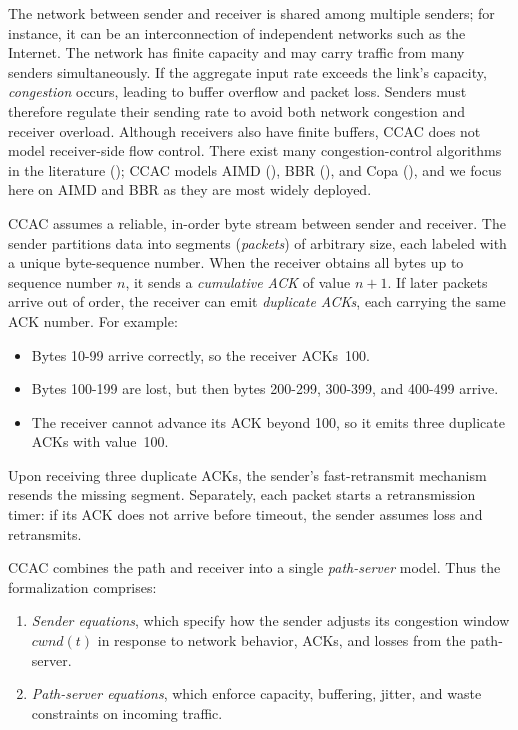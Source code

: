\documentclass[12pt]{l4dc2023}
\begin{document}
The network between sender and receiver is shared among multiple senders; for instance, it can be an interconnection of independent networks such as the Internet. The network has finite capacity and may carry traffic from many senders simultaneously.  
If the aggregate input rate exceeds the link's capacity, \emph{congestion} occurs, leading to buffer overflow and packet loss. Senders must therefore regulate their sending rate to avoid both network congestion and receiver overload. Although receivers also have finite buffers, CCAC does not model receiver-side flow control. There exist many congestion-control algorithms in the literature (\cite{jiang_when_2021}); CCAC models AIMD (\cite{aimd}), BBR (\cite{bbr}), and Copa (\cite{copa}), and we focus here on AIMD and BBR as they are most widely deployed.

CCAC assumes a reliable, in-order byte stream between sender and receiver. The sender partitions data into segments (\emph{packets}) of arbitrary size, each labeled with a unique byte-sequence number. When the receiver obtains all bytes up to sequence number $n$, it sends a \emph{cumulative ACK} of value $n{+}1$. If later packets arrive out of order, the receiver can emit \emph{duplicate ACKs}, each carrying the same ACK number.                                                                                                                                                                                                          
For example:
\begin{itemize}
  \item Bytes 10-99 arrive correctly, so the receiver ACKs~100.
  \item Bytes 100-199 are lost, but then bytes 200-299, 300-399, and 400-499 arrive.
  \item The receiver cannot advance its ACK beyond 100, so it emits three duplicate ACKs with value~100.
\end{itemize}
Upon receiving three duplicate ACKs, the sender's fast-retransmit mechanism resends the missing segment.  
Separately, each packet starts a retransmission timer: if its ACK does not arrive before timeout, the sender assumes loss and retransmits.

CCAC combines the path and receiver into a single \emph{path-server} model. Thus the formalization comprises:
\begin{enumerate}
  \item \emph{Sender equations}, which specify how the sender adjusts its congestion window $cwnd(t)$ in response to network behavior, ACKs, and losses from the path-server.
  \item \emph{Path-server equations}, which enforce capacity, buffering, jitter, and waste constraints on incoming traffic.
\end{enumerate}
\end{document}
